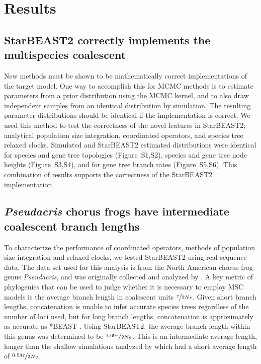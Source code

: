 \documentclass[nogrid]{MBE}%
\begin{document}
\section{Results}

\subsection{StarBEAST2 correctly implements the multispecies coalescent}

New methods must be shown to be mathematically correct implementations of the
target model. One way to accomplish this for MCMC methods is to estimate
parameters from a prior distribution using the MCMC kernel, and to also draw
independent samples from an identical distribution by simulation. The resulting
parameter distributions should be identical if the implementation is correct. We
used this method to test the correctness of the novel features in StarBEAST2;
analytical population size integration, coordinated operators, and species tree
relaxed clocks. Simulated and StarBEAST2 estimated distributions were identical
for species and gene tree topologies (Figure~S1,S2), species and gene tree node
heights (Figure~S3,S4), and for gene tree branch rates (Figure~S5,S6). This
combination of results supports the correctness of the StarBEAST2
implementation.

\subsection{\textit{Pseudacris} chorus frogs have intermediate coalescent branch lengths}

To characterize the performance of coordinated operators, methods of population size
integration and relaxed clocks, we tested StarBEAST2 using real sequence data.
The data set used for this analysis is from the North American chorus frog genus
\textit{Pseudacris}, and was originally collected and analyzed by
\cite{Barrow201478}. A key metric of phylogenies that can be used to judge
whether it is necessary to employ MSC models is the average
branch length in coalescent units $\nicefrac{\tau}{2Ne}$. Given short branch
lengths, concatenation is unable to infer accurate species trees regardless of
the number of loci used, but for long branch lengths, concatenation is
approximately as accurate as *BEAST \citep{Ogilvie01052016}. Using StarBEAST2,
the average branch length within this genus was determined to be
$\nicefrac{1.69\tau}{2Ne}$. This is an intermediate average length, longer than
the shallow simulations analyzed by \cite{Ogilvie01052016} which had a short
average length of $\nicefrac{0.54\tau}{2Ne}$.
\end{document}
